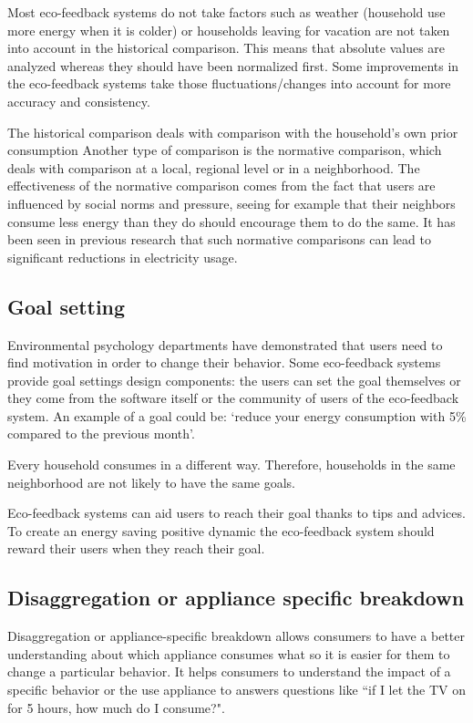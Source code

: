 \documentclass[journal]{vgtc}                %
\begin{document}
Most eco-feedback systems do not take factors such as weather (household use more energy when it is colder) or households leaving for vacation are not taken into account in the historical comparison\cite{karjalainen2011consumer}. This means that absolute values are analyzed whereas they should have been normalized first. Some improvements in the eco-feedback systems take those fluctuations/changes into account for more accuracy and consistency.

The historical comparison deals with comparison with the household's own prior consumption Another type of comparison is the normative comparison, which deals with comparison at a local, regional level or in a neighborhood. The effectiveness of the normative comparison comes from the fact that users are influenced by social norms and pressure, seeing for example that their neighbors consume less energy than they do should encourage them to do the same. It has been seen in previous research that such normative comparisons can lead to significant reductions in electricity usage\cite{peschiera2010response,siero1996changing,iyer2006comparison}.


\newpage
\subsection{Goal setting}
Environmental psychology departments have demonstrated that users need to find motivation in order to change their behavior. Some eco-feedback systems provide goal settings design components: the users can set the goal themselves or they come from the software itself or the community of users of the eco-feedback system. An example of a goal could be: `reduce your energy consumption with 5\% compared to the previous month'.

Every household consumes in a different way. Therefore, households in the same neighborhood are not likely to have the same goals.

Eco-feedback systems can aid users to reach their goal thanks to tips and advices.
To create an energy saving positive dynamic the eco-feedback system should reward their users when they reach their goal. 

\subsection{Disaggregation or appliance specific breakdown}
Disaggregation or appliance-specific breakdown allows consumers to have a better understanding about which appliance consumes what so it is easier for them to change a particular behavior. It helps consumers to understand the impact of a specific behavior or the use appliance to answers questions like ``if I let the TV on for 5 hours, how much do I consume?".
\end{document}
